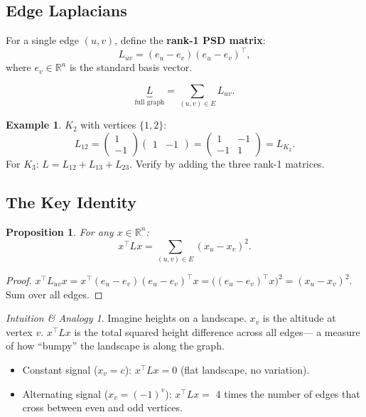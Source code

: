 \documentclass[12pt]{article}
\newtheorem{proposition}[theorem]{Proposition}
\theoremstyle{definition}
\newtheorem{example}[theorem]{Example}
\theoremstyle{remark}
\newtheorem{intuition}[theorem]{Intuition \& Analogy}
\begin{document}
\subsection{Edge Laplacians}

For a single edge $(u,v)$, define the \textbf{rank-1 PSD matrix}:
\[
  L_{uv} = (e_u - e_v)(e_u - e_v)^\top,
\]
where $e_v \in \mathbb{R}^n$ is the standard basis vector.

\[
  \underbrace{L}_{\text{full graph}} = \sum_{(u,v)\in E} L_{uv}.
\]

\begin{example}
$K_2$ with vertices $\{1,2\}$:
\[
  L_{12} = \begin{pmatrix}1\\-1\end{pmatrix}\begin{pmatrix}1&-1\end{pmatrix}
          = \begin{pmatrix}1&-1\\-1&1\end{pmatrix} = L_{K_2}.
\]
For $K_3$: $L = L_{12} + L_{13} + L_{23}$.  Verify by adding the three rank-1 matrices.
\end{example}

\subsection{The Key Identity}
\label{sec:key-identity}

\begin{proposition}
For any $x \in \mathbb{R}^n$:
\[
  \boxed{x^\top L x = \sum_{(u,v)\in E}(x_u - x_v)^2.}
\]
\end{proposition}

\begin{proof}
$x^\top L_{uv} x = x^\top(e_u-e_v)(e_u-e_v)^\top x = \bigl((e_u-e_v)^\top x\bigr)^2 = (x_u-x_v)^2$.
Sum over all edges.
\end{proof}

\begin{intuition}
Imagine heights on a landscape.  $x_v$ is the altitude at vertex $v$.
$x^\top L x$ is the total squared height difference across all edges---
a measure of how ``bumpy'' the landscape is along the graph.
\begin{itemize}
  \item Constant signal ($x_v = c$): $x^\top L x = 0$ (flat landscape, no variation).
  \item Alternating signal ($x_v = (-1)^v$): $x^\top L x = $ 4 times the number of edges
        that cross between even and odd vertices.
\end{itemize}
\end{intuition}
\end{document}
